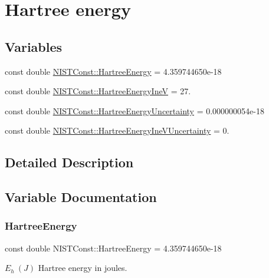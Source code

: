 \hypertarget{group___hartree_energy}{}\section{Hartree energy}
\label{group___hartree_energy}
\subsection*{Variables}
\begin{DoxyCompactItemize}
\item 
const double \hyperlink{group___hartree_energy_gab58dc1c4e59e83d4fb1217778fe9f29b}{N\+I\+S\+T\+Const\+::\+Hartree\+Energy} = 4.\+359744650e-\/18
\item 
const double \hyperlink{group___hartree_energy_ga400eb5b8c9b55b0f601870ba54120364}{N\+I\+S\+T\+Const\+::\+Hartree\+Energy\+IneV} = 27.
\item 
const double \hyperlink{group___hartree_energy_gaabdf38a4c491ca0f606bf042c8479801}{N\+I\+S\+T\+Const\+::\+Hartree\+Energy\+Uncertainty} = 0.\+000000054e-\/18
\item 
const double \hyperlink{group___hartree_energy_gaa6e7ae83f510023bdd88d80dae80f97d}{N\+I\+S\+T\+Const\+::\+Hartree\+Energy\+Ine\+V\+Uncertainty} = 0.
\end{DoxyCompactItemize}


\subsection{Detailed Description}


\subsection{Variable Documentation}
\mbox{\label{group___hartree_energy_gab58dc1c4e59e83d4fb1217778fe9f29b}} 
\subsubsection{\texorpdfstring{Hartree\+Energy}{HartreeEnergy}}
{\footnotesize\ttfamily const double N\+I\+S\+T\+Const\+::\+Hartree\+Energy = 4.\+359744650e-\/18}

$E_h \ (J)$ Hartree energy in joules. \mbox{\label{group___hartree_energy_ga400eb5b8c9b55b0f601870ba54120364}} 
